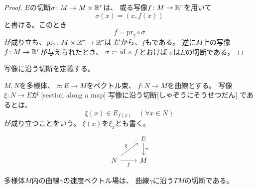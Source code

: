 \documentclass[report]{jlreq}
\begin{document}

\begin{proof}
    $E$の切断$\sigma \colon M \to M \times \mathbb{R}^r$は、
    或る写像$f \colon M \to \mathbb{R}^r$を用いて
    \begin{equation}
        \sigma(x) = (x, f(x))
    \end{equation}
    と書ける。このとき
    \begin{equation}
        f = \mathrm{pr}_2 \circ \sigma
    \end{equation}
    が成り立ち、$\mathrm{pr}_2 \colon M \times \mathbb{R}^r \to \mathbb{R}^r$は
    {\smooth}だから、$f$も{\smooth}である。
    逆に$M$上の{\smooth}写像$f \colon M \to \mathbb{R}^r$が与えられたとき、
    $\sigma \coloneqq \mathrm{id} \times f$とおけば
    $\sigma$は$E$の切断である。
\end{proof}

写像に沿う切断を定義する。

\begin{definition}[写像に沿う切断]
    $M, N$を多様体、
    $\pi \colon E \to M$をベクトル束、
    $f \colon N \to M$を{\smooth}曲線とする。
    {\smooth}写像$\xi \colon N \to E$が
    [section along a map]
    {写像に沿う切断}[しゃぞうにそうせつだん]
    であるとは、
    \begin{equation}
        \xi(x) \in E_{f(x)}
            \quad
            (\forall x \in N)
    \end{equation}
    が成り立つことをいう。
    $\xi(x)$を$\xi_x$とも書く。
    \begin{equation}
        \begin{tikzcd}
            & E \ar{d}{\pi} \\
            N \ar{ru}{\xi} \ar{r}[swap]{f}
                & M
        \end{tikzcd}
    \end{equation}
\end{definition}

\begin{example}
    多様体$M$内の曲線$\gamma$の速度ベクトル場は、
    曲線$\gamma$に沿う$TM$の切断である。
\end{example}
\end{document}
